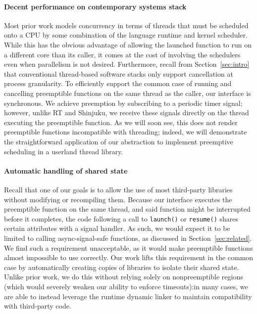 \paragraph{Decent performance on contemporary systems stack}
Most prior work models concurrency in terms of threads that must be scheduled onto
a CPU by some combination of the language runtime and kernel scheduler.  While this
has the obvious advantage of allowing the launched function to run on a different
core than its caller, it comes at the cost of involving the schedulers even when
parallelism is not desired.  Furthermore, recall from Section~\ref{sec:intro} that
conventional thread-based software stacks only support cancellation at process
granularity.  To efficiently support the common case of running and cancelling
preemptible functions on the same thread as the caller,
our interface is synchronous.  We achieve preemption by subscribing to
a periodic timer signal; however, unlike RT and Shinjuku, we receive these signals
directly on the thread executing the preemptible function.  As we will soon see, this
does not render preemptible functions incompatible with threading; indeed, we will
demonstrate the straightforward application of our abstraction to implement
preemptive scheduling in a userland thread library.

\paragraph{Automatic handling of shared state}
Recall that one of our goals is to allow the use of most third-party libraries
without modifying or recompiling them.
Because our interface executes the preemptible function on the same thread, and said
function might be interrupted before it completes, the code following a call to
\texttt{launch()} or \texttt{resume()} shares certain attributes with a signal
handler.  As
such, we would expect it to be limited to calling async-signal-safe functions, as
discussed in Section~\ref{sec:related}.  We find such a requirement unacceptable, as
it would make preemptible functions almost impossible to use correctly.  Our work
lifts this requirement in the common case by automatically creating copies of
libraries to isolate their shared state.
Unlike prior work, we do this without relying solely on nonpreemptible regions
(which would severely weaken our ability to enforce timeouts):\@ in many cases, we
are able to instead leverage the runtime dynamic linker to maintain compatibility
with third-party code.

